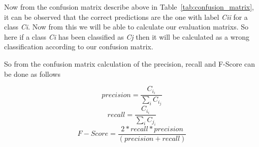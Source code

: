 \documentclass[sigconf]{acmart}
\theoremstyle{break}
\begin{document}
    \begin{table}[h!]
        \centering
        \small
        \caption{Confusion Matrix}
        \label{tab:confusion_matrix}
    \end{table}
    
    Now from the confusion matrix describe above in Table~\ref{tab:confusion_matrix}, it can be observed that the correct predictions are the one with label {\em Cii} for a class {\em Ci}. Now from this we will be able to calculate our evaluation matrixs. So here if a class {\em Ci} has been classified as {\em Cj} then it will be calculated as a wrong classification according to our confusion matrix.
    
    So from the confusion matrix calculation of the precision, recall and F-Score can be done as follows
    
    \begin{equation}
        precision = \frac{C_i_i}{\sum\limits_{i}C_i_j}
    \end{equation}
        \begin{equation}
        recall = \frac{C_i_i}{\sum\limits_{i}C_j_i}
    \end{equation}
        \begin{equation}
        F-Score = \frac{2*recall*precision}{(precision + recall)}
    \end{equation}
\end{document}
